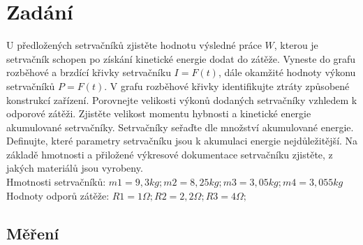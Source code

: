 \documentclass{article}
\begin{document}


\section*{Zadání}
U předložených setrvačníků zjistěte hodnotu výsledné práce \(W\), kterou je setrvačník schopen po získání kinetické energie dodat do zátěže.
Vyneste do grafu rozběhové a brzdící křivky setrvačníku \(I = F (t)\), dále okamžité hodnoty výkonu setrvačníků \(P = F (t)\). 
V grafu rozběhové křivky identifikujte ztráty způsobené konstrukcí zařízení. 
Porovnejte velikosti výkonů dodaných setrvačníky vzhledem k odporové zátěži.
Zjistěte velikost momentu hybnosti a kinetické energie akumulované setrvačníky. 
Setrvačníky seřaďte dle množství akumulované energie. 
Definujte, které parametry setrvačníku jsou k akumulaci energie nejdůležitější.
Na základě hmotnosti a přiložené výkresové dokumentace setrvačníku zjistěte, z jakých materiálů jsou vyrobeny.\\
Hmotnosti setrvačníků: \(m1 = 9,3 kg; m2 = 8,25 kg; m3 = 3,05 kg; m4 = 3,055 kg\)\\
Hodnoty odporů zátěže: \(R1 = 1 \Omega; R2 = 2,2 \Omega; R3 = 4 \Omega;\)\\


\subsection{Měření}
\end{document}
